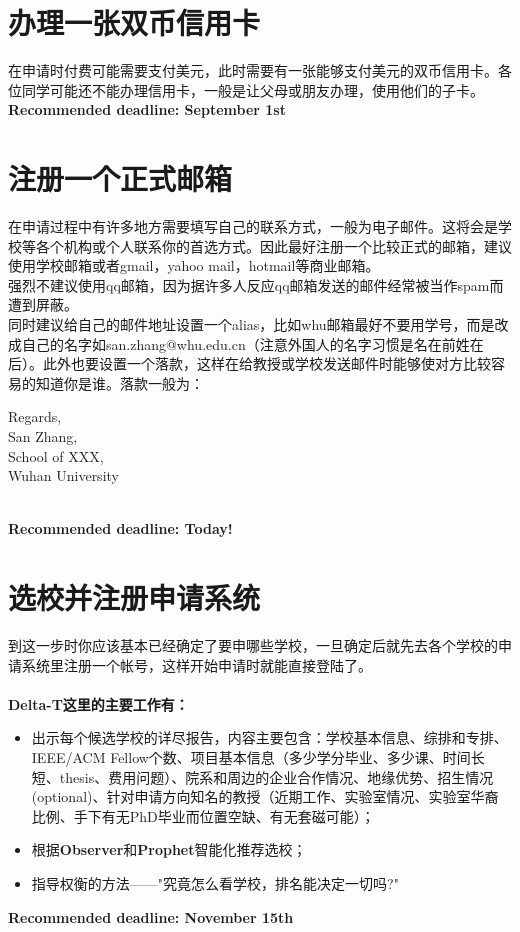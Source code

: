 \documentclass{article}
\begin{document}
\section{办理一张双币信用卡}
在申请时付费可能需要支付美元，此时需要有一张能够支付美元的双币信用卡。各位同学可能还不能办理信用卡，一般是让父母或朋友办理，使用他们的子卡。\\
\textbf{Recommended deadline: September 1st}

\section{注册一个正式邮箱}
在申请过程中有许多地方需要填写自己的联系方式，一般为电子邮件。这将会是学校等各个机构或个人联系你的首选方式。因此最好注册一个比较正式的邮箱，建议使用学校邮箱或者gmail，yahoo mail，hotmail等商业邮箱。\\
\indent 强烈不建议使用qq邮箱，因为据许多人反应qq邮箱发送的邮件经常被当作spam而遭到屏蔽。\\
\indent 同时建议给自己的邮件地址设置一个alias，比如whu邮箱最好不要用学号，而是改成自己的名字如\textcolor{colorname}{san.zhang@whu.edu.cn}（注意外国人的名字习惯是名在前姓在后）。此外也要设置一个落款，这样在给教授或学校发送邮件时能够使对方比较容易的知道你是谁。落款一般为：
\begin{description}
{\small Regards,\\
San Zhang,\\
School of XXX,\\
Wuhan University}
\end{description}\\
\textbf{Recommended deadline: Today!}

\section{选校并注册申请系统}
到这一步时你应该基本已经确定了要申哪些学校，一旦确定后就先去各个学校的申请系统里注册一个帐号，这样开始申请时就能直接登陆了。\\
\\
\indent\textcolor{colorname2}{\bf Delta-T这里的主要工作有：}
\begin{itemize}
\item{出示每个候选学校的详尽报告，内容主要包含：学校基本信息、综排和专排、IEEE/ACM Fellow个数、项目基本信息（多少学分毕业、多少课、时间长短、thesis、费用问题）、院系和周边的企业合作情况、地缘优势、招生情况(optional)、针对申请方向知名的教授（近期工作、实验室情况、实验室华裔比例、手下有无PhD毕业而位置空缺、有无套磁可能）；}
\item{根据{\bf Observer}和{\bf Prophet}智能化推荐选校；}
\item{指导权衡的方法——"究竟怎么看学校，排名能决定一切吗?"}
\end{itemize}
\textbf{Recommended deadline: November 15th}
\end{document}
